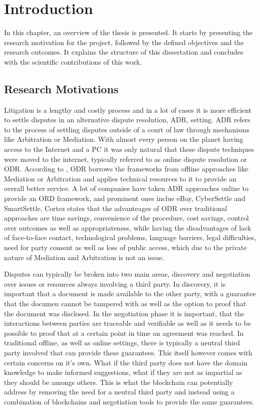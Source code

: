 \documentclass[12pt,msc,a4paper,oneside]{ucl_thesis}
\begin{document}
\setcounter{tocdepth}{2}

\tableofcontents
\listoffigures
\listoftables

\chapter{Introduction}
\label{sec:introduction}
In this chapter, an overview of the thesis is presented. It starts by presenting the research motivation for the project, followed by the defined objectives and the research outcomes. It explains the structure of this dissertation and concludes with the scientific contributions of this work.

\section{Research Motivations}
Litigation is a lengthy and costly process and in a lot of cases it is more efficient to settle disputes in an alternative dispute resolution, ADR, setting. ADR refers to the process of settling disputes outside of a court of law through mechanisms like Arbitration or Mediation. With almost every person on the planet having access to the Internet and a PC it was only natural that these dispute techniques were moved to the internet, typically referred to as online dispute resolution or ODR. According to \cite{katsh:odr}, ODR borrows the frameworks from offline approaches like Mediation or Arbitration and applies technical resources to it to provide an overall better service. A lot of companies have taken ADR approaches online to provide an ORD framework, and prominent ones inclue eBay, CyberSettle and SmartSettle. Cortez \cite{cortes2011online} states that the advanteages of ODR over traditional approaches are time savings, convenience of the procedure, cost savings, control over outcomes as well as appropriateness, while having the disadvantages of lack of face-to-face contact, technological problems, language barriers, legal difficulties, need for party consent as well as loss of public access, which due to the private nature of Mediation and Arbitration is not an issue.

Disputes can typically be broken into two main areas, discovery and negotiation over issues or resources always involving a third party. In discovery, it is important that a document is made available to the other party, with a guarantee that the documen cannot be tampered with as well as the option to proof that the document was disclosed. In the negotiation phase it is important, that the interactions between parties are traceable and verifiable as well as it needs to be possible to proof that at a certain point in time an agreement was reached. In traditional offline, as well as online settings, there is typically a neutral third party involved that can provide these guarantees. This itself however comes with certain concerns on it's own. What if the third party does not have the domain knowledge to make informed suggestions, what if they are not as impartial as they should be amongs others. This is what the blockchain can potentially address by removing the need for a neutral third party and instead using a combination of blockchains and negotiation tools to provide the same guarantees.
\end{document}
